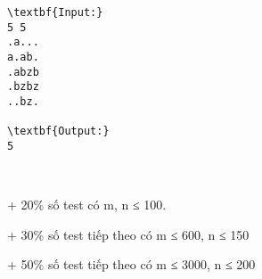\begin{verbatim}
\textbf{Input:}
5 5
.a...
a.ab.
.abzb
.bzbz
..bz.

\textbf{Output:}
5
\end{verbatim}
 

+ 20\% số test có m, n ≤ 100.

+ 30\% số test tiếp theo có m ≤ 600, n ≤ 150

+ 50\% số test tiếp theo có m ≤ 3000, n ≤ 200 \textbf{}